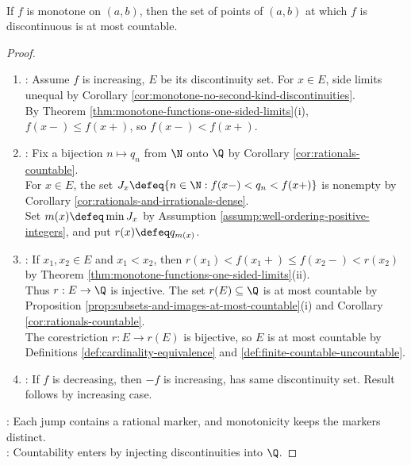 \begin{theorem} \label{thm:monotone-discontinuities-countable} \\
If $f$ is monotone on $(a,b)$, then the set of points of $(a,b)$ at which $f$ is discontinuous is at most countable.
\begin{proof}
\begin{enumerate}[label=(\roman*)]
\setlength{\itemsep}{0pt}
\item {}: Assume $f$ is increasing, $E$ be its discontinuity set. For $x\in E$, side limits unequal by Corollary \ref{cor:monotone-no-second-kind-discontinuities}.\\
By Theorem \ref{thm:monotone-functions-one-sided-limits}(i), $f(x-)\leq f(x+)$, so $f(x-)<f(x+)$.
\item {}: Fix a bijection $n\mapsto q_n$ from $\N$ onto $\Q$ by Corollary \ref{cor:rationals-countable}.\\
For $x\in E$, the set $J_x\defeq\{n\in\N:f(x-)<q_n<f(x+)\}$ is nonempty by Corollary \ref{cor:rationals-and-irrationals-dense}.\\
Set $m(x)\defeq\min J_x$ by Assumption \ref{assump:well-ordering-positive-integers}, and put $r(x)\defeq q_{m(x)}$.
\item {}: If $x_1,x_2\in E$ and $x_1<x_2$, then $r(x_1)<f(x_1+)\leq f(x_2-)<r(x_2)$ by Theorem \ref{thm:monotone-functions-one-sided-limits}(ii).\\
Thus $r:E\to\Q$ is injective. The set $r(E)\subseteq\Q$ is at most countable by Proposition \ref{prop:subsets-and-images-at-most-countable}(i) and Corollary \ref{cor:rationals-countable}.\\
The corestriction $r:E\to r(E)$ is bijective, so $E$ is at most countable by Definitions \ref{def:cardinality-equivalence} and \ref{def:finite-countable-uncountable}.
\item {}: If $f$ is decreasing, then $-f$ is increasing, has same discontinuity set. Result follows by increasing case.
\end{enumerate}
: Each jump contains a rational marker, and monotonicity keeps the markers distinct.\\
: Countability enters by injecting discontinuities into $\Q$.
\end{proof}
\end{theorem}

